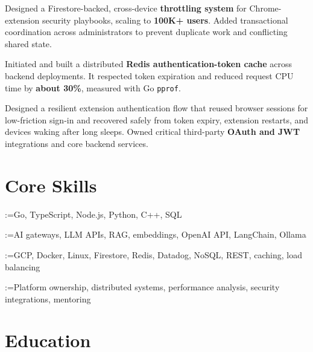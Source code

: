 \documentclass[]{plushcv}
\makeatletter
\newcommand{\bullets}[1]{%
  \def\@skillsep{\,\textbullet\,}%
  \@tempswatrue
  \@for\@tempa:=#1\do{%
    \if@tempswa
      \@tempswafalse
      \@tempa
    \else
      \@skillsep \@tempa
    \fi
  }%
}
\makeatother
\begin{document}
\begin{minipage}[t]{0.70\textwidth}
\vspace{\topsep}
\begin{tightemize}
  \sectionsep
  \item Designed a Firestore-backed, cross-device \textbf{throttling system} for Chrome-extension security playbooks, scaling to \textbf{100K+ users}. Added transactional coordination across administrators to prevent duplicate work and conflicting shared state.
  \item Initiated and built a distributed \textbf{Redis authentication-token cache} across backend deployments. It respected token expiration and reduced request CPU time by \textbf{about 30\%}, measured with Go \texttt{pprof}.
  \item Designed a resilient extension authentication flow that reused browser sessions for low-friction sign-in and recovered safely from token expiry, extension restarts, and devices waking after long sleeps. Owned critical third-party \textbf{OAuth and JWT} integrations and core backend services.
\end{tightemize}
\sectionsep

\end{minipage}
\hfill
\begin{minipage}[t]{0.25\textwidth}

\section{Core Skills}
\sectionsep
\bullets{Go, TypeScript, Node.js, Python, C++, SQL} \\
\sectionsep
{}
\sectionsep

\sectionsep
\bullets{AI gateways, LLM APIs, RAG, embeddings, OpenAI API, LangChain, Ollama}
\sectionsep

\sectionsep
\bullets{GCP, Docker, Linux, Firestore, Redis, Datadog, NoSQL, REST, caching, load balancing}
\sectionsep

\sectionsep
\bullets{Platform ownership, distributed systems, performance analysis, security integrations, mentoring}
\sectionsep

\section{Education}
\sectionsep

\end{minipage}
\end{document}
